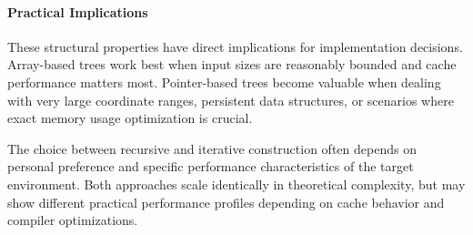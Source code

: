 \paragraph{Practical Implications}

These structural properties have direct implications for implementation decisions. Array-based trees work best when input sizes are reasonably bounded and cache performance matters most. Pointer-based trees become valuable when dealing with very large coordinate ranges, persistent data structures, or scenarios where exact memory usage optimization is crucial.

The choice between recursive and iterative construction often depends on personal preference and specific performance characteristics of the target environment. Both approaches scale identically in theoretical complexity, but may show different practical performance profiles depending on cache behavior and compiler optimizations.